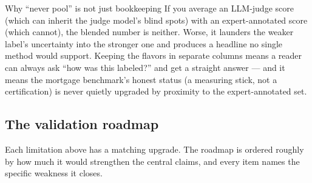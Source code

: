 \begin{background}{Why ``never pool'' is not just bookkeeping}
If you average an LLM-judge score (which can inherit the judge model's blind spots) with an expert-annotated score (which cannot), the blended number is neither. Worse, it launders the weaker label's uncertainty into the stronger one and produces a headline no single method would support. Keeping the flavors in separate columns means a reader can always ask ``how was this labeled?'' and get a straight answer --- and it means the mortgage benchmark's honest status (a measuring stick, not a certification) is never quietly upgraded by proximity to the expert-annotated set.
\end{background}

\subsection{The validation roadmap}
\label{sec:roadmap}

Each limitation above has a matching upgrade. The roadmap is ordered roughly by how much it would strengthen the central claims, and every item names the specific weakness it closes.

